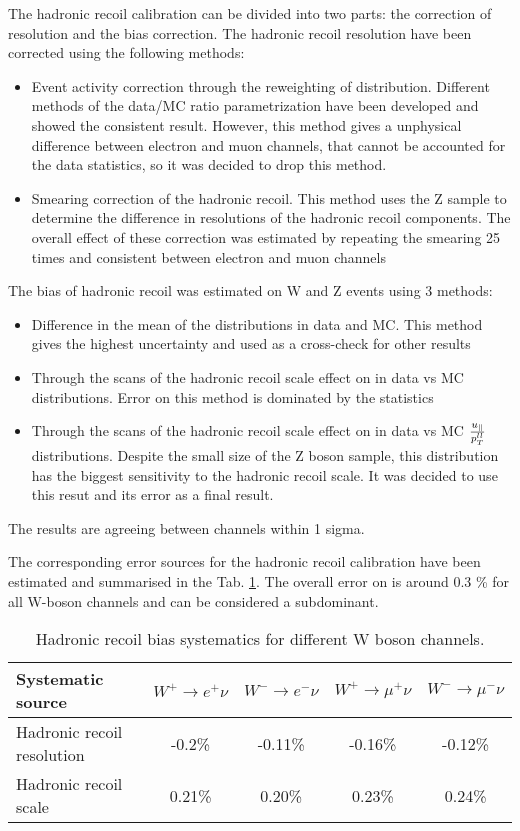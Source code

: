 The hadronic recoil calibration can be divided into two parts: the correction of resolution and the bias correction. 
The hadronic recoil resolution have been corrected using the following methods:
\begin{itemize}
\item Event activity correction through the reweighting of \sumet distribution. Different methods of the data/MC ratio parametrization have been developed and showed the consistent result. However, this method gives a unphysical difference between electron and muon channels, that cannot be accounted for the data statistics, so it was decided to drop this method.
\item Smearing correction of the hadronic recoil. This method uses the Z sample to determine the difference in resolutions of the hadronic recoil components. The overall effect of these correction was estimated by repeating the smearing 25 times and consistent between electron and muon channels
\end{itemize}

The bias of hadronic recoil  was estimated on W and Z events using 3 methods:
\begin{itemize}
\item Difference in the mean of the \mtw distributions in data and MC. This method gives the highest uncertainty and used as a cross-check for other results
\item Through the scans of the hadronic recoil scale effect on \chiD in data vs MC \mtw distributions. Error on this method is dominated by the statistics
\item Through the scans of the hadronic recoil scale effect on \chiD in data vs MC $\frac{u_{\parallel}}{p_T^{ll}}$ distributions. Despite the small size of the Z boson sample, this distribution has the biggest sensitivity to the hadronic recoil scale. It was decided to use this resut and its error as a final result.
\end{itemize}
The results are agreeing between channels within 1 sigma.

The corresponding error sources for the hadronic recoil calibration have been estimated and summarised in the Tab. \ref{tab:SFHadronRecoilBias}. The overall error on \etmiss is around 0.3 \% for all W-boson channels and can be considered a subdominant.

\begin{table}[!tb]
\caption{Hadronic recoil bias systematics for different W boson channels.}
\label{tab:SFHadronRecoilBias}
\begin{center}
\begin{tabular}{| l || c | c | c | c |}
\hline
Systematic source & $W^{+} \to e^{+}\nu$ & $W^{-} \to e^{-}\nu$  & $W^{+} \to \mu^{+}\nu$ & $W^{-} \to \mu^{-}\nu$ \\
\hline
\hline
Hadronic recoil resolution & -0.2\% & -0.11\% & -0.16\% & -0.12\% \\
Hadronic recoil scale &  0.21\% & 0.20\% & 0.23\% & 0.24\% \\
\hline
\end{tabular}
\end{center}
\end{table}